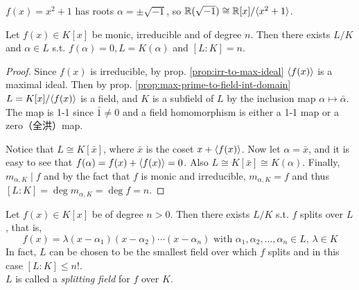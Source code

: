 \begin{example}
  $f(x) = x^2 + 1$ has roots $\alpha = \pm \sqrt{-1}$, so $\mathbb{R}(\sqrt{-1}) \cong \mathbb{R}[x] / \langle x^2 + 1 \rangle$.
\end{example}

\begin{theorem} \label{thm:field-ext-1}
  Let $f(x) \in K[x]$ be monic, irreducible and of degree $n$. Then there exists
  $L / K$ and $\alpha \in L$ s.t. $f(\alpha) = 0, L = K(\alpha)$ and $[L: K] = n$.
  \begin{proof}
    Since $f(x)$ is irreducible, by prop. \ref{prop:irr-to-max-ideal}
    $\langle f(x) \rangle$ is a maximal ideal. Then by prop.
    \ref{prop:max-prime-to-field-int-domain} $L = K[x] / \langle f(x) \rangle$ is a field,
    and $K$ is a subfield of $L$ by the inclusion map $\alpha \mapsto \bar\alpha$.
    The map is 1-1 since $\bar{1} \neq 0$ and a field homomorphism is either a
    1-1 map or a zero（全洪）map.

    Notice that $L \cong K[\bar{x}]$, where $\bar{x}$ is the coset $x + \langle f(x) \rangle$.
    Now let $\alpha = \bar{x}$, and it is easy to see that $f(\alpha) = f(x) + \langle f(x) \rangle = 0$.
    Also $L \cong K[\bar{x}] \cong K(\alpha)$. Finally, $m_{\alpha, K} \mid f$ and by the fact that
    $f$ is monic and irreducible, $m_{\alpha, K} = f$ and thus $[L: K] = \deg m_{\alpha, K} = \deg f = n$.
  \end{proof}
\end{theorem}

\begin{theorem}
  Let $f(x) \in K[x]$ be of degree $n > 0$. Then there exists $L/K$ s.t. $f$
  splits over $L$, that is,
  \[ f(x) = \lambda (x - \alpha_1) (x - \alpha_2) \dotsm (x - \alpha_n) \text{ with }
    \alpha_1, \alpha_2, \dots, \alpha_n \in L,\, \lambda \in K \]
  In fact, $L$ can be chosen to be the smallest field over which $f$ splits and in this case $[L : K] \leq n!$.\\
  $L$ is called a \emph{splitting field}  for $f$ over $K$.
\end{theorem}

